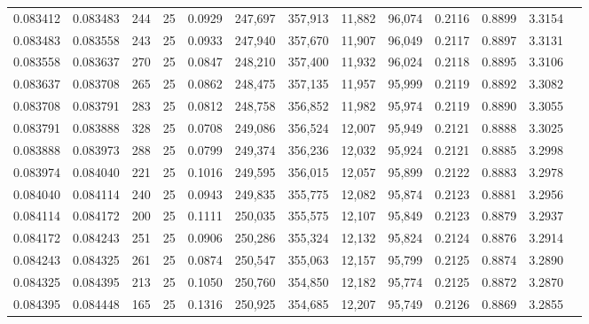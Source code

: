 \begin{tabular}{rrrrrrrrrrrrr}
0.083412 & 0.083483 &   244 &  25 &                                     0.0929 & 247,697 & 357,913 &  11,882 &  96,074 & 0.2116 & 0.8899 & 3.3154 \\
0.083483 & 0.083558 &   243 &  25 &                                     0.0933 & 247,940 & 357,670 &  11,907 &  96,049 & 0.2117 & 0.8897 & 3.3131 \\
0.083558 & 0.083637 &   270 &  25 &                                     0.0847 & 248,210 & 357,400 &  11,932 &  96,024 & 0.2118 & 0.8895 & 3.3106 \\
0.083637 & 0.083708 &   265 &  25 &                                     0.0862 & 248,475 & 357,135 &  11,957 &  95,999 & 0.2119 & 0.8892 & 3.3082 \\
0.083708 & 0.083791 &   283 &  25 &                                     0.0812 & 248,758 & 356,852 &  11,982 &  95,974 & 0.2119 & 0.8890 & 3.3055 \\
0.083791 & 0.083888 &   328 &  25 &                                     0.0708 & 249,086 & 356,524 &  12,007 &  95,949 & 0.2121 & 0.8888 & 3.3025 \\
0.083888 & 0.083973 &   288 &  25 &                                     0.0799 & 249,374 & 356,236 &  12,032 &  95,924 & 0.2121 & 0.8885 & 3.2998 \\
0.083974 & 0.084040 &   221 &  25 &                                     0.1016 & 249,595 & 356,015 &  12,057 &  95,899 & 0.2122 & 0.8883 & 3.2978 \\
0.084040 & 0.084114 &   240 &  25 &                                     0.0943 & 249,835 & 355,775 &  12,082 &  95,874 & 0.2123 & 0.8881 & 3.2956 \\
0.084114 & 0.084172 &   200 &  25 &                                     0.1111 & 250,035 & 355,575 &  12,107 &  95,849 & 0.2123 & 0.8879 & 3.2937 \\
0.084172 & 0.084243 &   251 &  25 &                                     0.0906 & 250,286 & 355,324 &  12,132 &  95,824 & 0.2124 & 0.8876 & 3.2914 \\
0.084243 & 0.084325 &   261 &  25 &                                     0.0874 & 250,547 & 355,063 &  12,157 &  95,799 & 0.2125 & 0.8874 & 3.2890 \\
0.084325 & 0.084395 &   213 &  25 &                                     0.1050 & 250,760 & 354,850 &  12,182 &  95,774 & 0.2125 & 0.8872 & 3.2870 \\
0.084395 & 0.084448 &   165 &  25 &                                     0.1316 & 250,925 & 354,685 &  12,207 &  95,749 & 0.2126 & 0.8869 & 3.2855 \\

\end{tabular}
